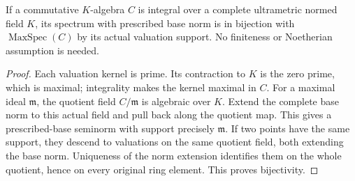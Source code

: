 \begin{theorem}
\label{spectrum:integral-field-support-classification}
\leanok
{}
If a commutative $K$-algebra $C$ is integral over a complete
ultrametric normed field $K$, its spectrum with prescribed base norm
is in bijection with $\operatorname{MaxSpec}(C)$ by its actual
valuation support. No finiteness or Noetherian assumption is needed.
\end{theorem}
\begin{proof}
Each valuation kernel is prime. Its contraction to $K$ is the zero
prime, which is maximal; integrality makes the kernel maximal in
$C$. For a maximal ideal $\mathfrak m$, the quotient field
$C/\mathfrak m$ is algebraic over $K$. Extend the complete base norm
to this actual field and pull back along the quotient map. This
gives a prescribed-base seminorm with support precisely $\mathfrak m$.
If two points have the same support, they descend to valuations on
the same quotient field, both extending the base norm. Uniqueness
of the norm extension identifies them on the whole quotient, hence
on every original ring element. This proves bijectivity.
\end{proof}

